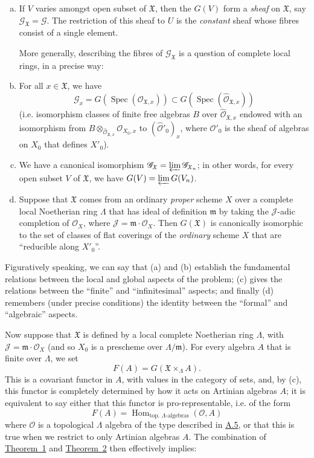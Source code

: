 \documentclass{article}
\newcommand{\scr}[1]{{\mathscr{#1}}}
\newcommand{\fk}[1]{{\mathfrak{#1}}}
\DeclareMathOperator{\Hom}{Hom}
\DeclareMathOperator{\Spec}{Spec}
\newcommand{\oldpage}[1]{\marginpar{\footnotesize$\Big\vert$ \textit{p.~#1}}}
\begin{document}
\begin{enumerate}[(a)]
  \item If $V$ varies amongst open subset of $\fk{X}$, then the $G(V)$ form a \emph{sheaf} on $\fk{X}$, say $\scr{G}_\fk{X}=\scr{G}$.
    The restriction of this sheaf to $U$ is the \emph{constant} sheaf whose fibres consist of a single element.

    More generally, describing the fibres of $\scr{G}_\fk{X}$ is a question of complete local rings, in a precise way:
  \item For all $x\in\fk{X}$, we have
    \[
      \scr{G}_x = G(\Spec(\scr{O}_{\fk{X},x})) \subset G(\Spec(\widehat{\scr{O}}_{\fk{X},x}))
    \]
    (i.e. isomorphism classes of finite free algebras $B$ over $\widehat{\scr{O}}_{\fk{X},x}$ endowed with an isomorphism from $B\otimes_{\widehat{\scr{O}}_{\fk{X},x}}\scr{O}_{X_0,x}$ to $(\widehat{\scr{O}}'_0)_x$, where $\scr{O}'_0$ is the sheaf of algebras on $X_0$ that defines $X'_0$).
  \item We have a canonical isomorphism $\scr{G}_\fk{X}=\varprojlim\scr{G}_{\fk{X}_n}$; in other words, for every open subset $V$ of $\fk{X}$, we have $G(V)=\varprojlim G(V_n)$.
  \item Suppose that $\fk{X}$ comes from an ordinary \emph{proper} scheme $X$ over a complete local Noetherian ring $\Lambda$ that has ideal of definition $\fk{m}$ by taking the $\scr{J}$-adic completion of $\scr{O}_X$, where $\scr{J}=\fk{m}\cdot\scr{O}_X$.
    Then $G(\fk{X})$ is canonically isomorphic to the set of classes of flat coverings of the \emph{ordinary} scheme $X$ that are ``reducible along $X'_0$''.
\end{enumerate}

Figuratively speaking, we can say that (a) and (b) establish the fundamental relations between the local and global aspects of the problem; (c) gives the relations between the ``finite'' and ``infinitesimal'' aspects; and finally (d) remembers (under precise conditions) the identity between the ``formal'' and ``algebraic'' aspects.

Now suppose that $\fk{X}$ is defined by a local complete Noetherian ring $\Lambda$, with $\scr{J}=\fk{m}\cdot\scr{O}_X$ (and so $X_0$ is a prescheme over $\Lambda/\fk{m}$).
For every algebra $A$ that is finite over $\Lambda$, we set
\[
  F(A) = G(\fk{X}\times_\Lambda A).
\]
This is a covariant functor in $A$, with values in the category of sets, and, by (c), this functor is completely determined by how it acts on Artinian algebras $A$;
it is equivalent to say either that this functor is pro-representable, i.e. of the form
\[
  F(A) = \Hom_{\mbox{top. $\Lambda$-algebras}}(\scr{O},A)
\]
\oldpage{195-21}
where $\scr{O}$ is a topological $\Lambda$ algebra of the type described in \hyperref[A.5]{A.5}, or that this is true when we restrict to only Artinian algebras $A$.
The combination of \hyperref[B-theorem1]{Theorem~1} and \hyperref[B-theorem2]{Theorem~2} then effectively implies:
\end{document}
